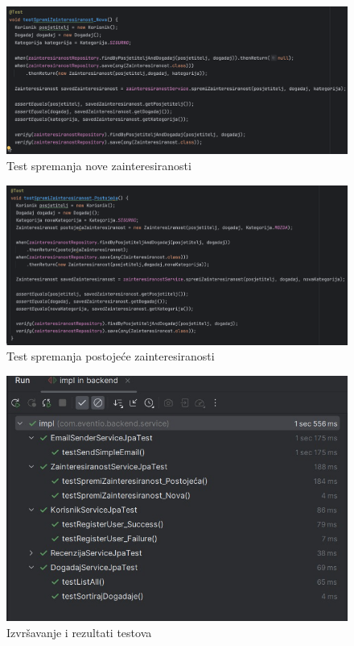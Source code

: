 			\begin{figure}[H]
				\includegraphics[scale=0.45]{testovi/zainteresiranostTest1.png}
				\centering
				\caption{Test spremanja nove zainteresiranosti}
				\label{fig:promjene}
			\end{figure}
			
			\begin{figure}[H]
				\includegraphics[scale=0.45]{testovi/zainteresiranostTest2.png}
				\centering
				\caption{Test spremanja postojeće zainteresiranosti}
				\label{fig:promjene}
			\end{figure}
			
				\begin{figure}[H]
				\includegraphics[scale=0.45]{testovi/unit_testovi.jpeg}
				\centering
				\caption{Izvršavanje i rezultati testova}
				\label{fig:promjene}
			\end{figure}
			
